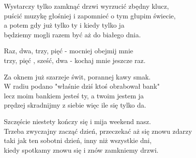 \begin{text}
    Wystarczy tylko zamknąć drzwi wyrzucić zbędny klucz,\\
    puścić muzykę głośniej i zapomnieć o tym głupim świecie,\\
    a potem gdy już tylko ty i kiedy tylko ja\\
    będziemy mogli razem być aż do białego dnia.

    Raz, dwa, trzy, pięć - mocniej obejmij mnie\\
    trzy, pięć , sześć, dwa - kochaj mnie jeszcze raz.

    Za oknem już szarzeje świt, porannej kawy smak.\\
    W radiu podano "właśnie dziś ktoś obrabował bank"\\
    lecz moim bankiem jesteś ty, a twoim jestem ja\\
    prędzej skradnijmy z siebie więc ile się tylko da.

    Szczęście niestety kończy się i mija weekend nasz.\\
    Trzeba zwyczajny zacząć dzień, przeczekać aż się znowu zdarzy\\
    taki jak ten sobotni dzień, inny niż wszystkie dni,\\
    kiedy spotkamy znowu się i znów zamkniemy drzwi.
\end{text}
\begin{chord}

\end{chord}